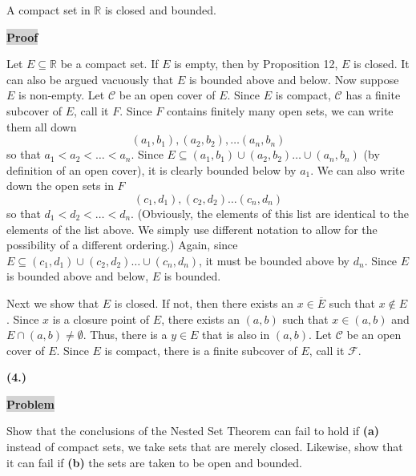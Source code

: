 \documentclass[12pt]{article}
\newcommand{\mybox}{%
    \collectbox{%
        \setlength{\fboxsep}{2pt}%
        \fbox{\BOXCONTENT}%
    }%
}
\begin{document}
\noindent A compact set in $\mathbb{R}$ is closed and bounded. 

\vspace{5mm}

\noindent\mybox{\colorbox{lightgray}{\textbf{Proof}}}\hspace{3mm}\hrulefill

\noindent Let $E\subseteq\mathbb{R}$ be a compact set. If $E$ is empty, then by Proposition 12, $E$ is closed. It can also be argued vacuously that $E$ is bounded above and below. Now suppose $E$ is non-empty. Let $\mathscr{C}$ be an open cover of $E$. Since $E$ is compact, $\mathscr{C}$ has a finite subcover of $E$, call it $F$. Since $F$ contains finitely many open sets, we can write them all down $$(a_1, b_1), (a_2, b_2), \ldots (a_n, b_n)$$ so that $a_1 < a_2 < \ldots < a_n.$ Since $E\subseteq (a_1,b_1)\cup (a_2, b_2) \ldots \cup (a_n, b_n)$ (by definition of an open cover), it is clearly bounded below by $a_1$. We can also write down the open sets in $F$ $$(c_1, d_1), (c_2, d_2) \ldots (c_n, d_n)$$ so that $d_1 < d_2 < \ldots < d_n$.  (Obviously, the elements of this list are identical to the elements of the list above. We simply use different notation to allow for the possibility of a different ordering.) Again, since $E\subseteq (c_1, d_1) \cup (c_2, d_2) \ldots \cup (c_n, d_n)$, it must be bounded above by $d_n$.  Since $E$ is bounded above and below, $E$ is bounded. 

\vspace{3mm}

\noindent Next we show that $E$ is closed. If not, then there exists an $x\in\overline{E}$ such that $x\not\in E$. Since $x$ is a closure point of $E$, there exists an $(a,b)$ such that $x\in(a,b)$ and $E\cap(a,b)\neq\emptyset$. Thus, there is a $y\in E$ that is also in $(a,b)$. Let $\mathscr{C}$ be an open cover of $E$. Since $E$ is compact, there is a finite subcover of $E$, call it $\mathscr{F}$.

\pagebreak

\noindent \textbf{(4.)}

\vspace{3mm}

\noindent\mybox{\colorbox{lightgray}{\textbf{Problem}}}\hspace{3mm}\hrulefill

\noindent Show that the conclusions of the Nested Set Theorem can fail to hold if \textbf{(a)} instead of compact sets, we take sets that are merely closed. Likewise, show that it can fail if \textbf{(b)} the sets are taken to be open and bounded.
\end{document}
